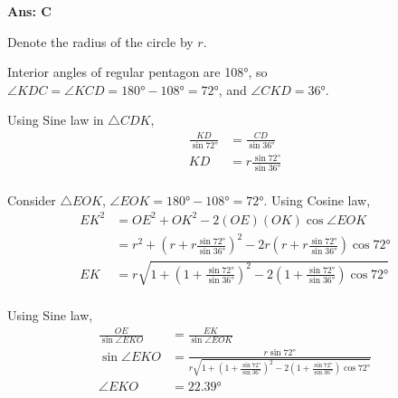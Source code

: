 \documentclass[border=3pt,varwidth=80mm]{standalone}
\begin{document}
\begin{answer}
\hrulefill\par
\textbf{Ans: C}

Denote the radius of the circle by $r$.

Interior angles of regular pentagon are \ang{108}, so $\angle KDC = \angle KCD = \ang{180} - \ang{108} = \ang{72}$, and $\angle CKD = \ang{36}$.

Using Sine law in $\bigtriangleup CDK$,
\begin{equation*}
\begin{aligned}
\frac{KD}{\sin\ang{72}} &= \frac{CD}{\sin\ang{36}} \\
KD &= r\frac{\sin\ang{72}}{\sin\ang{36}} \\
\end{aligned}
\end{equation*}

Consider $\bigtriangleup EOK$, $\angle EOK = \ang{180}-\ang{108} = \ang{72}$. Using Cosine law,
\begin{equation*}
\begin{aligned}
EK^2 &= OE^2 + OK^2 - 2(OE)(OK)\cos\angle EOK \\
&= r^2 + (r+r\frac{\sin\ang{72}}{\sin\ang{36}})^2 - 2r(r+r\frac{\sin\ang{72}}{\sin\ang{36}})\cos\ang{72} \\
EK &= r\sqrt{1 + (1+\frac{\sin\ang{72}}{\sin\ang{36}})^2 - 2(1+\frac{\sin\ang{72}}{\sin\ang{36}})\cos\ang{72}} \\
\end{aligned}
\end{equation*}

Using Sine law,
\begin{equation*}
\begin{aligned}
\frac{OE}{\sin\angle EKO} &= \frac{EK}{\sin\angle EOK} \\
\sin\angle EKO &= \frac{r\sin\ang{72}}{r\sqrt{1 + (1+\frac{\sin\ang{72}}{\sin\ang{36}})^2 - 2(1+\frac{\sin\ang{72}}{\sin\ang{36}})\cos\ang{72}}} \\
\angle EKO &= \ang{22.39} \\
\end{aligned}
\end{equation*}

\end{answer}
\end{document}
